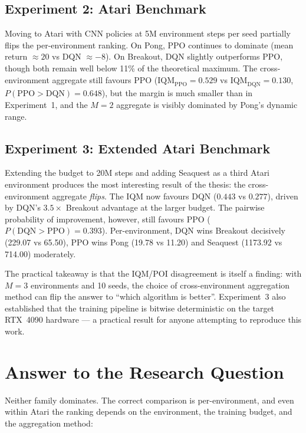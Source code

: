 \subsection{Experiment 2: Atari Benchmark}

Moving to Atari with CNN policies at 5M environment steps per seed
partially flips the per-environment ranking. On Pong, PPO continues to
dominate (mean return $\approx 20$ vs DQN $\approx -8$). On Breakout,
DQN slightly outperforms PPO, though both remain well below 11\% of the
theoretical maximum. The cross-environment aggregate still favours PPO
($\text{IQM}_{\text{PPO}} = 0.529$ vs $\text{IQM}_{\text{DQN}} = 0.130$,
$P(\text{PPO} > \text{DQN}) = 0.648$), but the margin is much smaller
than in Experiment~1, and the $M=2$ aggregate is visibly dominated by
Pong's dynamic range.

\subsection{Experiment 3: Extended Atari Benchmark}

Extending the budget to 20M steps and adding Seaquest as a third Atari
environment produces the most interesting result of the thesis: the
cross-environment aggregate \emph{flips}. The IQM now favours DQN
($0.443$ vs $0.277$), driven by DQN's $3.5\times$ Breakout advantage at
the larger budget. The pairwise probability of improvement, however,
still favours PPO ($P(\text{DQN} > \text{PPO}) = 0.393$). Per-environment,
DQN wins Breakout decisively (229.07 vs 65.50), PPO wins Pong (19.78 vs
11.20) and Seaquest (1173.92 vs 714.00) moderately.

The practical takeaway is that the IQM/POI disagreement is itself a
finding: with $M=3$ environments and 10 seeds, the choice of
cross-environment aggregation method can flip the answer to ``which
algorithm is better''. Experiment~3 also established that the training
pipeline is bitwise deterministic on the target RTX~4090 hardware --- a
practical result for anyone attempting to reproduce this work.


\section{Answer to the Research Question}


Neither family dominates. The correct comparison is per-environment,
and even within Atari the ranking depends on the environment, the
training budget, and the aggregation method:

